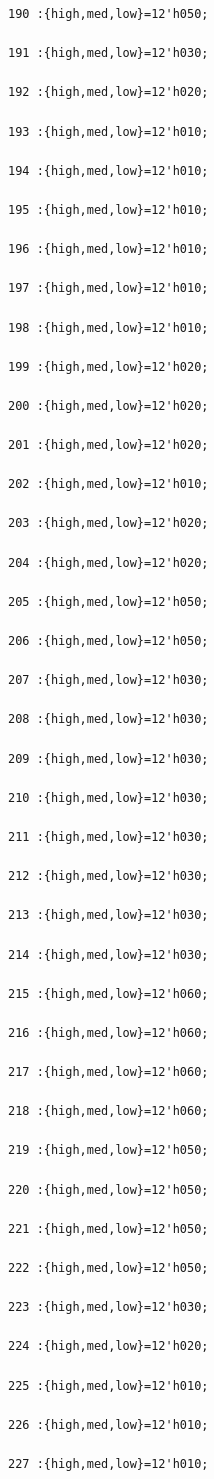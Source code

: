 \documentclass[UTF8]{ctexart}
\begin{document}
\begin{verbatim}
190 :{high,med,low}=12'h050;

191 :{high,med,low}=12'h030;

192 :{high,med,low}=12'h020;

193 :{high,med,low}=12'h010;

194 :{high,med,low}=12'h010;

195 :{high,med,low}=12'h010;

196 :{high,med,low}=12'h010;

197 :{high,med,low}=12'h010;

198 :{high,med,low}=12'h010;

199 :{high,med,low}=12'h020;

200 :{high,med,low}=12'h020;

201 :{high,med,low}=12'h020;

202 :{high,med,low}=12'h010;

203 :{high,med,low}=12'h020;

204 :{high,med,low}=12'h020;

205 :{high,med,low}=12'h050;

206 :{high,med,low}=12'h050;

207 :{high,med,low}=12'h030;

208 :{high,med,low}=12'h030;

209 :{high,med,low}=12'h030;

210 :{high,med,low}=12'h030;

211 :{high,med,low}=12'h030;

212 :{high,med,low}=12'h030;

213 :{high,med,low}=12'h030;

214 :{high,med,low}=12'h030;

215 :{high,med,low}=12'h060;

216 :{high,med,low}=12'h060;

217 :{high,med,low}=12'h060;

218 :{high,med,low}=12'h060;

219 :{high,med,low}=12'h050;

220 :{high,med,low}=12'h050;

221 :{high,med,low}=12'h050;

222 :{high,med,low}=12'h050;

223 :{high,med,low}=12'h030;

224 :{high,med,low}=12'h020;

225 :{high,med,low}=12'h010;

226 :{high,med,low}=12'h010;

227 :{high,med,low}=12'h010;


\end{verbatim}
\end{document}
